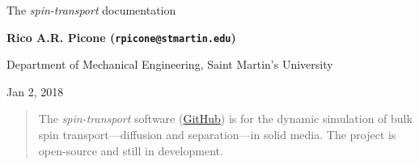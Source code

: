 \documentclass[%
oneside,                 %
final,                   %
10pt]{article}
\begin{document}

\newcommand{\exercisesection}[1]{\subsection*{#1}}







\thispagestyle{empty}

\begin{center}
{\LARGE\bf
\begin{spacing}{1.25}
The \emph{spin-transport} documentation
\end{spacing}
}
\end{center}


\begin{center}
{\bf Rico A.R. Picone (\texttt{rpicone@stmartin.edu})}
\end{center}

    \begin{center}
\centerline{{\small Department of Mechanical Engineering, Saint Martin's University}}
\end{center}
    

\begin{center}
Jan 2, 2018
\end{center}

\vspace{1cm}

\begin{abstract}
The \emph{spin-transport} software (\href{{https://github.com/ricopicone/spin-transport}}{GitHub}) is for the dynamic simulation of bulk spin transport---diffusion and separation---in solid media.
The project is open-source and still in development.
\end{abstract}

\tableofcontents


\vspace{1cm} %
\end{document}
